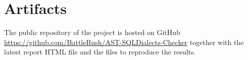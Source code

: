 \documentclass[acmsmall,nonacm]{acmart}
\begin{document}
\section{Artifacts}
The public repository of the project is hosted on GitHub \href{https://github.com/BattleRush/AST-SQLDialects-Checker}{https://github.com/BattleRush/AST-SQLDialects-Checker} together with the latest report HTML file and the files to reproduce the results.


\end{document}
